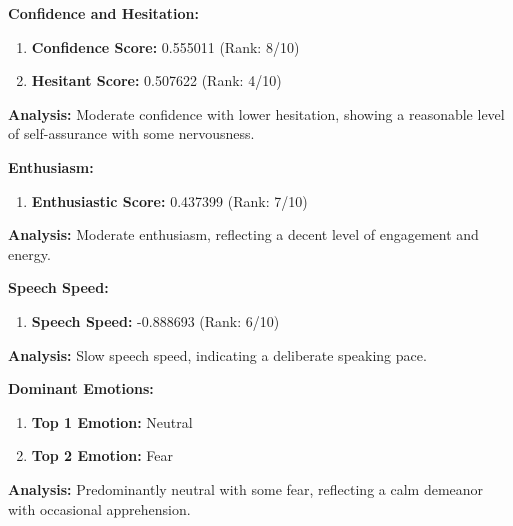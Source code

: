 \documentclass{article}
\begin{document}
\large{\textbf{Confidence and Hesitation:}}
\begin{tcolorbox}[colback=green!5!white,colframe=green!75!black,title=Confidence and Hesitant Scores]
    \begin{enumerate}
        \item \textbf{Confidence Score:} \textcolor{green!50!black}{0.555011} (Rank: 8/10)
        \item \textbf{Hesitant Score:} \textcolor{red!70!black}{0.507622} (Rank: 4/10)
    \end{enumerate}
\end{tcolorbox}
    \textbf{Analysis:} Moderate confidence with lower hesitation, showing a reasonable level of self-assurance with some nervousness.

\large{\textbf{Enthusiasm:}}
\begin{tcolorbox}[colback=blue!5!white,colframe=blue!75!black,title=Enthusiastic Score]
    \begin{enumerate}
        \item \textbf{Enthusiastic Score:} \textcolor{orange!70!black}{0.437399} (Rank: 7/10)
    \end{enumerate}
\end{tcolorbox}
    \textbf{Analysis:} Moderate enthusiasm, reflecting a decent level of engagement and energy.

\large{\textbf{Speech Speed:}}
\begin{tcolorbox}[colback=cyan!5!white,colframe=cyan!75!black,title=Speech Speed]
    \begin{enumerate}
        \item \textbf{Speech Speed:} \textcolor{purple!70!black}{-0.888693} (Rank: 6/10)
    \end{enumerate}
\end{tcolorbox}
    \textbf{Analysis:} Slow speech speed, indicating a deliberate speaking pace.

\large{\textbf{Dominant Emotions:}}
\begin{tcolorbox}[colback=red!5!white,colframe=red!75!black,title=Emotional State]
    \begin{enumerate}
        \item \textbf{Top 1 Emotion:} \textcolor{blue!80!black}{Neutral}
        \item \textbf{Top 2 Emotion:} \textcolor{red!80!black}{Fear}
    \end{enumerate}
\end{tcolorbox}
    \textbf{Analysis:} Predominantly neutral with some fear, reflecting a calm demeanor with occasional apprehension.
\end{document}

